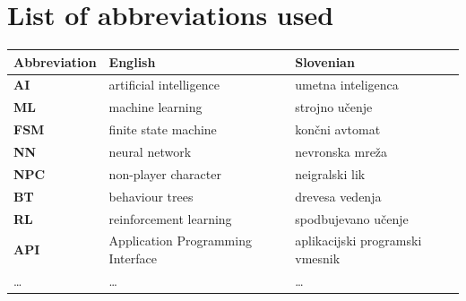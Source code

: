 \documentclass[a4paper, 12pt]{book}
\newcommand{\clearemptydoublepage}{\newpage{\pagestyle{empty}\cleardoublepage}}
\begin{document}
\pagestyle{empty}
\def\thepage{}%
\tableofcontents{}


\clearemptydoublepage



\chapter*{List of abbreviations used}  %

\noindent\begin{tabular}{p{}|p{}|p{}}    %
  {\bf Abbreviation} & {\bf English} & {\bf Slovenian} \\ \hline
  {\bf AI}      & artificial intelligence           & umetna inteligenca \\
  {\bf ML}      & machine learning                  & strojno učenje \\
  {\bf FSM}     & finite state machine              & končni avtomat \\
  {\bf NN}      & neural network                    & nevronska mreža \\
  {\bf NPC}     & non-player character              & neigralski lik \\
  {\bf BT }     & behaviour trees                   & drevesa vedenja \\
  {\bf RL }     & reinforcement learning            & spodbujevano učenje \\
  {\bf API }    & Application Programming Interface & aplikacijski programski vmesnik \\
  \dots         & \dots                             & \dots \\
\end{tabular}
\end{document}
